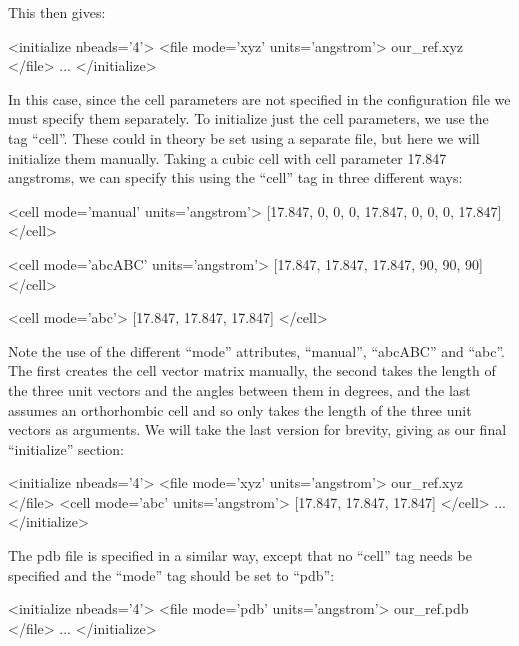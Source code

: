 \documentclass[11pt,english,fleqn]{report}
\newenvironment{code}{%
\footnotesize 
\verbatim
}{
\endverbatim
\normalsize
}
\begin{document}
This then gives:

\begin{code}
<initialize nbeads='4'>
   <file mode='xyz' units='angstrom'> our_ref.xyz </file>
   ...
</initialize>
\end{code}

In this case, since the cell parameters are not specified in the
configuration file we must specify them separately. 
To initialize just the cell parameters, we use the tag {}``cell''.
These could in theory be set using a separate
file, but here we will initialize them manually. Taking a cubic cell
with cell parameter 17.847 angstroms, we can specify this using
the {}``cell'' tag in three different ways:

\begin{code}
<cell mode='manual' units='angstrom'> 
   [17.847, 0, 0, 0, 17.847, 0, 0, 0, 17.847] 
</cell>
\end{code}

\begin{code}
<cell mode='abcABC' units='angstrom'>
   [17.847, 17.847, 17.847, 90, 90, 90]
</cell>
\end{code}

\begin{code}
<cell mode='abc'>
   [17.847, 17.847, 17.847]
</cell>
\end{code}

Note the use of the different {}``mode'' attributes, {}``manual'',
{}``abcABC'' and {}``abc''. The first creates the cell vector
matrix manually, the second takes the length of the three unit vectors
and the angles between them in degrees, and the last assumes an orthorhombic
cell and so only takes the length of the three unit vectors as arguments.
We will take the last version for brevity, giving as our final {}``initialize''
section:

\begin{code}
<initialize nbeads='4'>
   <file mode='xyz' units='angstrom'> our_ref.xyz </file>
   <cell mode='abc' units='angstrom'>
      [17.847, 17.847, 17.847]
   </cell>
   ...
</initialize>
\end{code}

The pdb file is specified in a similar way, except that no {}``cell''
tag needs be specified and the {}``mode'' tag should be
set to {}``pdb'':

\begin{code}
<initialize nbeads='4'>
   <file mode='pdb' units='angstrom'> our_ref.pdb </file>
   ...
</initialize>
\end{code}
\end{document}
